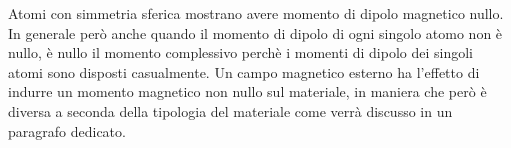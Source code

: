 Atomi con simmetria sferica mostrano avere momento di dipolo magnetico nullo. In generale però
anche quando il momento di dipolo di ogni singolo atomo non è nullo, è nullo il momento complessivo
perchè i momenti di dipolo dei singoli atomi sono disposti casualmente. Un campo magnetico esterno
ha l'effetto di indurre un momento magnetico non nullo sul materiale, in maniera che però è diversa a seconda
della tipologia del materiale come verrà discusso in un paragrafo dedicato.
